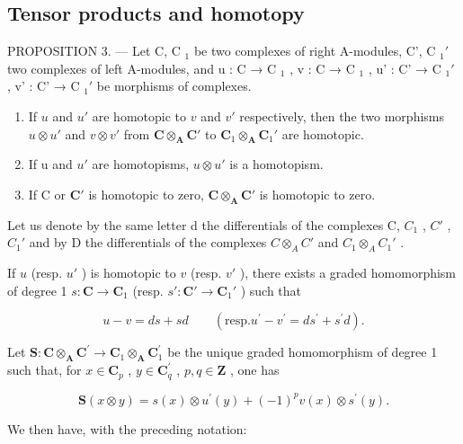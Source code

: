 \subsection{Tensor products and homotopy}

PROPOSITION 3. --- Let C, C \(_{1}\) be two complexes of right A-modules, C', C \(_{1}'\) two complexes of left A-modules, and u : C → C \(_{1}\) , v : C → C \(_{1}\) , u' : C' → C \(_{1}'\) , v' : C' → C \(_{1}'\) be morphisms of complexes.

\begin{enumerate}
\def\labelenumi{\alph{enumi})}
\item
  If \(u\) and \(u'\) are homotopic to \(v\) and \(v'\) respectively, then the two morphisms \(u \otimes u'\) and \(v \otimes v'\) from \(\mathbf{C} \otimes_{\mathbf{A}} \mathbf{C}'\) to \(\mathbf{C}_1 \otimes_{\mathbf{A}} \mathbf{C}_1'\) are homotopic.
\item
  If u and \(u'\) are homotopisms, \(u \otimes u'\) is a homotopism.
\item
  If C or \(\mathbf{C}'\) is homotopic to zero, \(\mathbf{C} \otimes_{\mathbf{A}} \mathbf{C}'\) is homotopic to zero.
\end{enumerate}

Let us denote by the same letter d the differentials of the complexes C, \(C_{1}\) , \(C'\) , \(C_{1}'\) and by D the differentials of the complexes \(C \otimes_{A} C'\) and \(C_{1} \otimes_{A} C_{1}'\) .

If \(u\) (resp. \(u'\) ) is homotopic to \(v\) (resp. \(v'\) ), there exists a graded homomorphism of degree 1 \(s: \mathbf{C} \to \mathbf{C}_1\) (resp. \(s': \mathbf{C}' \to \mathbf{C}_1'\) ) such that

\[
u - v = d s + s d \qquad (\mathrm{resp.} u ^ {\prime} - v ^ {\prime} = d s ^ {\prime} + s ^ {\prime} d).\tag{2}
\]

Let \(\mathbf{S}:\mathbf{C}\otimes_{\mathbf{A}}\mathbf{C}^{\prime}\to \mathbf{C}_{1}\otimes_{\mathbf{A}}\mathbf{C}_{1}^{\prime}\) be the unique graded homomorphism of degree 1 such that, for \(x\in \mathbf{C}_p\) , \(y\in \mathbf{C}_q^\prime\) , \(p,q\in \mathbf{Z}\) , one has

\[
\mathbf {S} (x \otimes y) = s (x) \otimes u ^ {\prime} (y) + (- 1) ^ {p} v (x) \otimes s ^ {\prime} (y).\tag{3}
\]

We then have, with the preceding notation:


